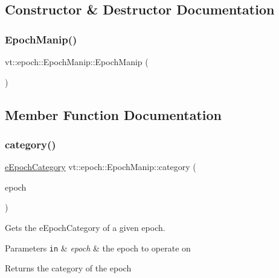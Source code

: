 \subsection{Constructor \& Destructor Documentation}
\mbox{\label{structvt_1_1epoch_1_1_epoch_manip_a8dd8d684917d7b17f726512920955b43}} 
\subsubsection{\texorpdfstring{Epoch\+Manip()}{EpochManip()}}
{\footnotesize\ttfamily vt\+::epoch\+::\+Epoch\+Manip\+::\+Epoch\+Manip (\begin{DoxyParamCaption}{ }\end{DoxyParamCaption})}



\subsection{Member Function Documentation}
\mbox{\label{structvt_1_1epoch_1_1_epoch_manip_aa61d47033545df147c01036211c4cabe}} 
\subsubsection{\texorpdfstring{category()}{category()}}
{\footnotesize\ttfamily \hyperlink{namespacevt_1_1epoch_a956abe0aceef0d10a988de8acb002c7c}{e\+Epoch\+Category} vt\+::epoch\+::\+Epoch\+Manip\+::category (\begin{DoxyParamCaption}\item[{\hyperlink{structvt_1_1epoch_1_1_epoch_type}{Epoch\+Type} const \&}]{epoch }\end{DoxyParamCaption})\hspace{0.3cm}{\ttfamily [static]}}



Gets the {\ttfamily e\+Epoch\+Category} of a given epoch. 


\begin{DoxyParams}[1]{Parameters}
\mbox{\tt in}  & {\em epoch} & the epoch to operate on\\
\hline
\end{DoxyParams}
\begin{DoxyReturn}{Returns}
the category of the {\ttfamily epoch} 
\end{DoxyReturn}
\mbox{\label{structvt_1_1epoch_1_1_epoch_manip_a6e96213acd8e0a160a4d4b9ab6a64eaf}} 
